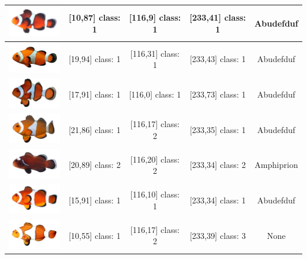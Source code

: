 \begin{longtable}{|c|c|c|c|c|}
	\includegraphics[width=3cm]{gambar/dataset_validasi/Amphiprion06} & [10,87] class: 1 & [116,9] class: 1 & [233,41] class: 1 & Abudefduf \\ \hline
	\includegraphics[width=3cm]{gambar/dataset_validasi/Amphiprion07} & [19,94] class: 1 & [116,31] class: 1 & [233,43] class: 1 & Abudefduf \\ \hline
	\includegraphics[width=3cm]{gambar/dataset_validasi/Amphiprion08} & [17,91] class: 1 & [116,0] class: 1 & [233,73] class: 1 & Abudefduf \\ \hline
	\includegraphics[width=3cm]{gambar/dataset_validasi/Amphiprion09} & [21,86] class: 1 & [116,17] class: 2 & [233,35] class: 1 & Abudefduf \\ \hline
	\includegraphics[width=3cm]{gambar/dataset_validasi/Amphiprion10} & [20,89] class: 2 & [116,20] class: 2 & [233,34] class: 2 & Amphiprion \\ \hline
	\includegraphics[width=3cm]{gambar/dataset_validasi/Amphiprion11} & [15,91] class: 1 & [116,10] class: 1 & [233,34] class: 1 & Abudefduf \\ \hline
	\includegraphics[width=3cm]{gambar/dataset_validasi/Amphiprion12} & [10,55] class: 1 & [116,17] class: 2 & [233,39] class: 3 & None \\ \hline

\end{longtable}
